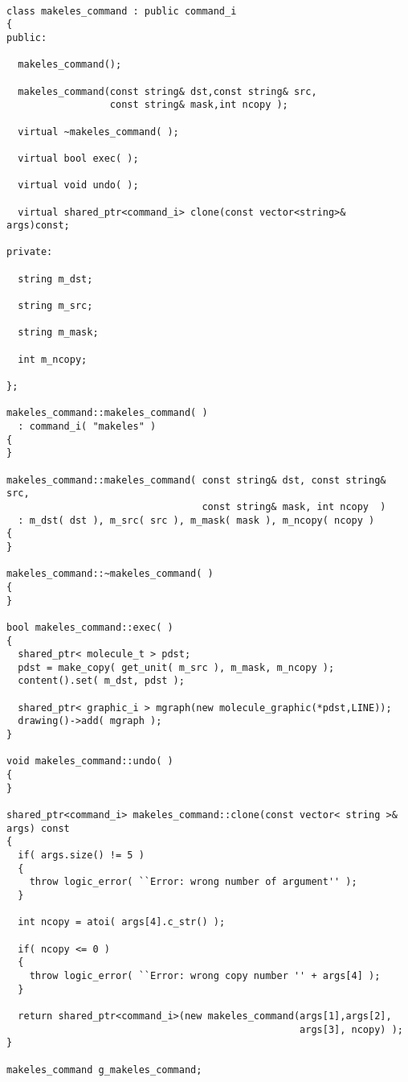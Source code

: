 \documentclass[letterpaper]{book}
\begin{document}
\begin{lstlisting}

class makeles_command : public command_i
{
public:

  makeles_command();

  makeles_command(const string& dst,const string& src, 
                  const string& mask,int ncopy );
    
  virtual ~makeles_command( );
    
  virtual bool exec( );
    
  virtual void undo( );
    
  virtual shared_ptr<command_i> clone(const vector<string>& args)const;
    
private:

  string m_dst;

  string m_src;
    
  string m_mask;
    
  int m_ncopy;
    
};
    
makeles_command::makeles_command( )
  : command_i( "makeles" )
{
}

makeles_command::makeles_command( const string& dst, const string& src, 
                                  const string& mask, int ncopy  )
  : m_dst( dst ), m_src( src ), m_mask( mask ), m_ncopy( ncopy )
{
}

makeles_command::~makeles_command( )
{
}

bool makeles_command::exec( )
{
  shared_ptr< molecule_t > pdst;
  pdst = make_copy( get_unit( m_src ), m_mask, m_ncopy );
  content().set( m_dst, pdst );
    
  shared_ptr< graphic_i > mgraph(new molecule_graphic(*pdst,LINE));
  drawing()->add( mgraph );
}

void makeles_command::undo( )
{
}

shared_ptr<command_i> makeles_command::clone(const vector< string >& args) const
{
  if( args.size() != 5 )
  {
    throw logic_error( ``Error: wrong number of argument'' );
  }
  
  int ncopy = atoi( args[4].c_str() );
    
  if( ncopy <= 0 )
  {
    throw logic_error( ``Error: wrong copy number '' + args[4] );
  }

  return shared_ptr<command_i>(new makeles_command(args[1],args[2], 
                                                   args[3], ncopy) );
}

makeles_command g_makeles_command;

\end{lstlisting}
\end{document}
